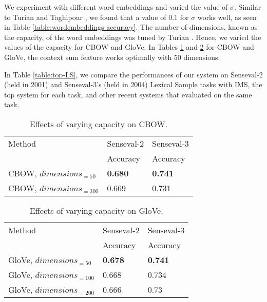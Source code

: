 We experiment with different word embeddings and varied the value of
$\sigma$. Similar to Turian 
and Taghipour , we found that a value of 0.1
for $\sigma$ works well, as seen in Table
\ref{table:wordembeddings-accuracy}. The number of dimensions, known
as the capacity, of the word embeddings was tuned by Turian
. Hence, we varied the values
of the capacity for CBOW and GloVe.  In Tables
\ref{table:wordembeddings-word2vec-accuracy} and
\ref{table:wordembeddings-glove-accuracy} for CBOW and GloVe, the
context sum feature works optimally with 50 dimensions.

In Table \ref{table:top-LS}, we compare the performances of our system
on Senseval-2 (held in 2001) and Senseval-3's (held in 2004) Lexical
Sample tasks with IMS, the top system for each task, and other recent
systems that evaluated on the same task.

\begin{table}[th]
	\caption{Effects of varying capacity on CBOW.}
	\label{table:wordembeddings-word2vec-accuracy}
	\begin{center}
		\begin{tabular}{| p{7cm} | p{3.5cm} | p{3.5cm} |}
			\hline
			Method & Senseval-2 & Senseval-3 \\
     		 	   &  Accuracy &  Accuracy \\
			\hline
			CBOW, $dimensions_{=50}$ & {\bf0.680} & {\bf0.741} \\
			\hline
			CBOW, $dimensions_{=300}$ & 0.669 & 0.731 \\
			\hline
		\end{tabular}
	\end{center}
\end{table}

\begin{table}[th]
	\caption{Effects of varying capacity on GloVe.}
	\label{table:wordembeddings-glove-accuracy}
	\begin{center}
		\begin{tabular}{| p{7cm} | p{3.5cm} | p{3.5cm} |}
			\hline
			Method & Senseval-2 & Senseval-3 \\
        		   & Accuracy & Accuracy \\
			\hline
			GloVe, $dimensions_{=50}$ & {\bf0.678} & {\bf0.741} \\
			\hline
			GloVe, $dimensions_{=100}$ & 0.668 & 0.734 \\
			\hline
			GloVe, $dimensions_{=200}$ & 0.666 & 0.73 \\
			\hline
		\end{tabular}
	\end{center}
\end{table}

